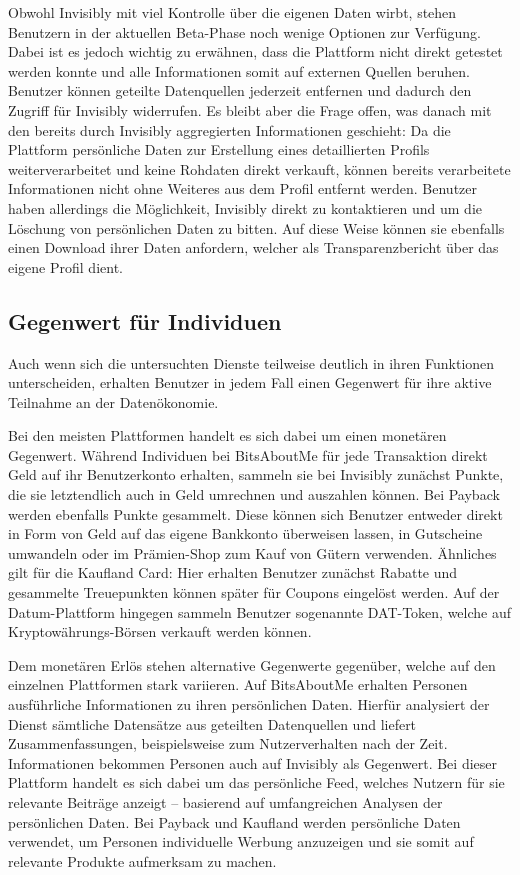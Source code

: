 \noindent Obwohl Invisibly mit viel Kontrolle über die eigenen Daten wirbt, stehen Benutzern in der aktuellen Beta-Phase noch wenige Optionen zur Verfügung. Dabei ist es jedoch wichtig zu erwähnen, dass die Plattform nicht direkt getestet werden konnte und alle Informationen somit auf externen Quellen beruhen. Benutzer können geteilte Datenquellen jederzeit entfernen und dadurch den Zugriff für Invisibly widerrufen. Es bleibt aber die Frage offen, was danach mit den bereits durch Invisibly aggregierten Informationen geschieht: Da die Plattform persönliche Daten zur Erstellung eines detaillierten Profils weiterverarbeitet und keine Rohdaten direkt verkauft, können bereits verarbeitete Informationen nicht ohne Weiteres aus dem Profil entfernt werden. Benutzer haben allerdings die Möglichkeit, Invisibly direkt zu kontaktieren und um die Löschung von persönlichen Daten zu bitten. Auf diese Weise können sie ebenfalls einen Download ihrer Daten anfordern, welcher als Transparenzbericht über das eigene Profil dient.

\subsection{Gegenwert für Individuen}
Auch wenn sich die untersuchten Dienste teilweise deutlich in ihren Funktionen unterscheiden, erhalten Benutzer in jedem Fall einen Gegenwert für ihre aktive Teilnahme an der Datenökonomie. \newline

\noindent Bei den meisten Plattformen handelt es sich dabei um einen monetären Gegenwert. Während Individuen bei BitsAboutMe für jede Transaktion direkt Geld auf ihr Benutzerkonto erhalten, sammeln sie bei Invisibly zunächst Punkte, die sie letztendlich auch in Geld umrechnen und auszahlen können. Bei Payback werden ebenfalls Punkte gesammelt. Diese können sich Benutzer entweder direkt in Form von Geld auf das eigene Bankkonto überweisen lassen, in Gutscheine umwandeln oder im Prämien-Shop zum Kauf von Gütern verwenden. Ähnliches gilt für die Kaufland Card: Hier erhalten Benutzer zunächst Rabatte und gesammelte Treuepunkten können später für Coupons eingelöst werden. Auf der Datum-Plattform hingegen sammeln Benutzer sogenannte DAT-Token, welche auf Kryptowährungs-Börsen verkauft werden können.\newline

\noindent Dem monetären Erlös stehen alternative Gegenwerte gegenüber, welche auf den einzelnen Plattformen stark variieren. Auf BitsAboutMe erhalten Personen ausführliche Informationen zu ihren persönlichen Daten. Hierfür analysiert der Dienst sämtliche Datensätze aus geteilten Datenquellen und liefert Zusammenfassungen, beispielsweise zum Nutzerverhalten nach der Zeit. Informationen bekommen Personen auch auf Invisibly als Gegenwert. Bei dieser Plattform handelt es sich dabei um das persönliche Feed, welches Nutzern für sie relevante Beiträge anzeigt -- basierend auf umfangreichen Analysen der persönlichen Daten. Bei Payback und Kaufland werden persönliche Daten verwendet, um Personen individuelle Werbung anzuzeigen und sie somit auf relevante Produkte aufmerksam zu machen.